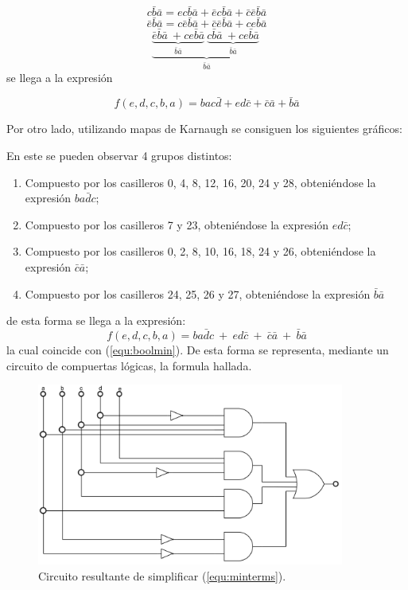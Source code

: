 \documentclass[a4paper]{article}
\begin{document}
\begin{center}
\[
		c\bar{b}\bar{a}= ec\bar{b}\bar{a}+\bar{e}c\bar{b}\bar{a}+\bar{c}\bar{e}\bar{b}\bar{a}
\]
\[
		\bar{e}\bar{b}\bar{a}=c\bar{e}\bar{b}\bar{a}+\bar{c}\bar{e}\bar{b}\bar{a}+ce\bar{b}\bar{a}
\]
\[
	\underbrace{\underbrace{\bar{e}\bar{b}\bar{a} \ + ce\bar{b}\bar{a}  }_{ \bar{b}\bar{a}}\ 
	\underbrace{c\bar{b}\bar{a} \ + ce\bar{b}\bar{a}  }_{ \bar{b}\bar{a}}\ }_{\bar{b}\bar{a}}
\]
se llega a la expresión

\begin{equation}
		f \left( e,d,c,b,a \right) =bac\bar{d}+ed\bar{c}+\bar{c}\bar{a}+\bar{b}\bar{a}
		\label{equ:boolmin}
\end{equation}
\end{center}

Por otro lado, utilizando mapas de Karnaugh se consiguen los siguientes gráficos:



En este se pueden observar 4 grupos distintos:
\begin{enumerate}
	\item Compuesto por los casilleros 0, 4, 8, 12, 16, 20, 24 y 28, obteniéndose la expresión $ b a \bar{d} c $;
	\item Compuesto por los casilleros 7 y 23, obteniéndose la expresión $ e d \bar{c} $;
	\item Compuesto por los casilleros 0, 2, 8, 10, 16, 18, 24 y 26, obteniéndose la expresión $ \bar{c} \bar{a} $;
	\item Compuesto por los casilleros 24, 25, 26 y 27, obteniéndose la expresión $ \bar{b} \bar{a} $
\end{enumerate}

de esta forma se llega a la expresión:
\[
	f \left( e,d,c,b,a \right) = b a \bar{d} c \ + \  e d \bar{c} \ + \ \bar{c} \bar{a} \ + \ \bar{b} \bar{a}
\]
la cual coincide con (\ref{equ:boolmin}). De esta forma se representa, mediante un circuito de compuertas lógicas, la formula hallada.

\begin{figure}[H]
	\centering
	\includegraphics[width=0.9\textwidth]{Circuito1.PNG}
\caption{Circuito resultante de simplificar (\ref{equ:minterms}).}
	\label{fig:circ1}
\end{figure}
\end{document}
